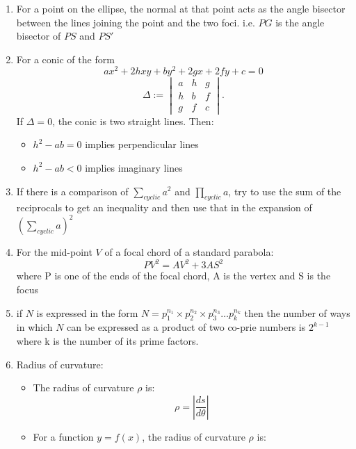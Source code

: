 \documentclass{article}
\numberwithin{equation}{section}
\numberwithin{figure}{section}
\newcommand{\Cr}{\times}
\newcommand{\Det}[1]{\left|#1\right|}
\begin{document}
\begin{enumerate}
		\item For a point on the ellipse, the normal at that point acts as the angle bisector between the lines joining the point and the two foci.
			i.e. $PG$ is the angle bisector of $PS$ and $PS'$
		\item For a conic of the form 
			\begin{equation*}
				ax^2+2hxy+by^2+2gx+2fy+c=0
			\end{equation*}
			\begin{equation}	
				\Delta :=
			\begin{vmatrix}
						a & h & g\\
						h & b & f\\
						g & f & c
			\end{vmatrix}.
			\end{equation}
		If $\Delta=0$, the conic is two straight lines. Then:
		\begin{itemize}
			\item $h^2-ab=0$ implies perpendicular lines
			\item $h^2-ab<0$ implies imaginary lines
		\end{itemize}
		\item If there is a comparison of $\displaystyle{\sum_{cyclic} a^2}$ and $\displaystyle{\prod_{cyclic} a}$, try to use the sum of the reciprocals to get an inequality and then use that in the expansion of $\displaystyle{\left(\sum_{cyclic}a\right)^2}$		
		\item For the mid-point $V$ of a focal chord of a standard parabola:
			\begin{equation}
				PV^2=AV^2+3 AS^2
			\end{equation}
			where P is one of the ends of the focal chord, A is the vertex and S is the focus
		\item if $N$ is expressed in the form $N=p_1^{n_1}\Cr p_2^{n_2}\Cr p_3^{n_3}\dots p_{k}^{n_k}$ then the number of ways in which $N$ can be expressed as a product of two co-prie numbers is $2^{k-1}$ where k is the number of its prime factors.
		\item Radius of curvature:
			\begin{itemize}
				\item The radius of curvature $\rho$ is:
					\begin{equation}
						\rho = \Det{\frac{ds}{d\theta}} 
					\end{equation}
				\item For a function $y=f(x)$, the radius of curvature $\rho$ is:
					\begin{equation}

\end{equation}
\end{itemize}
\end{enumerate}
\end{document}
